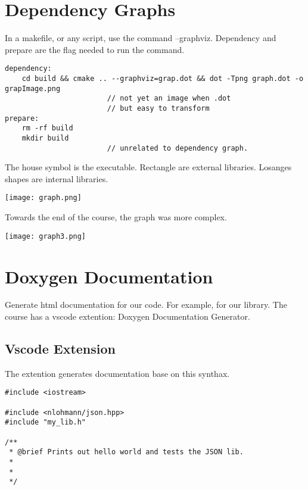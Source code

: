 \documentclass[openany]{report}
\begin{document}
\section{Dependency Graphs}

In a makefile, or any script, use the command --graphviz. Dependency and prepare are the flag needed to run the command.

\begin{verbatim}
dependency:
    cd build && cmake .. --graphviz=grap.dot && dot -Tpng graph.dot -o grapImage.png
                        // not yet an image when .dot
                        // but easy to transform
prepare:
    rm -rf build
    mkdir build
                        // unrelated to dependency graph.
\end{verbatim}

The house symbol is the executable. Rectangle are external libraries. Losanges shapes are internal libraries.

\begin{center}
    \texttt{[image: graph.png]}
\end{center}

Towards the end of the course, the graph was more complex.

\begin{center}
    \texttt{[image: graph3.png]}
\end{center}



\section{Doxygen Documentation}

Generate html documentation for our code. For example, for our library. The course has a vscode extention: Doxygen Documentation Generator.

\subsection{Vscode Extension}

The extention generates documentation base on this synthax.

\begin{verbatim}
#include <iostream>

#include <nlohmann/json.hpp>
#include "my_lib.h"

/**
 * @brief Prints out hello world and tests the JSON lib.
 *
 *
 */
\end{verbatim}
\end{document}
